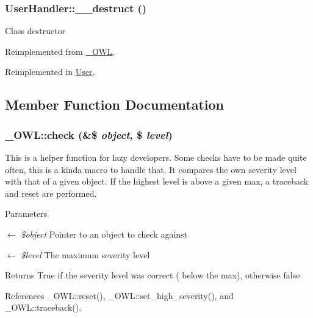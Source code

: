 \subsubsection[{\_\-\_\-destruct}]{\setlength{\rightskip}{0pt plus 5cm}UserHandler::\_\-\_\-destruct ()}\label{classUserHandler_a3e1f6381ed79caf6e1a255fb0a9cc386}
Class destructor 

Reimplemented from \hyperlink{class__OWL_a44fd2222476a3109286cc82d92b6bbcc}{\_\-OWL}.



Reimplemented in \hyperlink{classUser_accd20149a7414612c1505e022eb63ffc}{User}.



\subsection{Member Function Documentation}
\subsubsection[{check}]{\setlength{\rightskip}{0pt plus 5cm}\_\-OWL::check (\&\$ {\em object}, \/  \$ {\em level})}\label{class__OWL_ad6f4f6946f40199dd0333cf219fa500e}
This is a helper function for lazy developers. Some checks have to be made quite often, this is a kinda macro to handle that. It compares the own severity level with that of a given object. If the highest level is above a given max, a traceback and reset are performed.


\begin{DoxyParams}{Parameters}
\item[\mbox{$\leftarrow$} {\em \$object}]Pointer to an object to check against \item[\mbox{$\leftarrow$} {\em \$level}]The maximum severity level \end{DoxyParams}
\begin{DoxyReturn}{Returns}
True if the severity level was correct ( below the max), otherwise false 
\end{DoxyReturn}


References \_\-OWL::reset(), \_\-OWL::set\_\-high\_\-severity(), and \_\-OWL::traceback().



